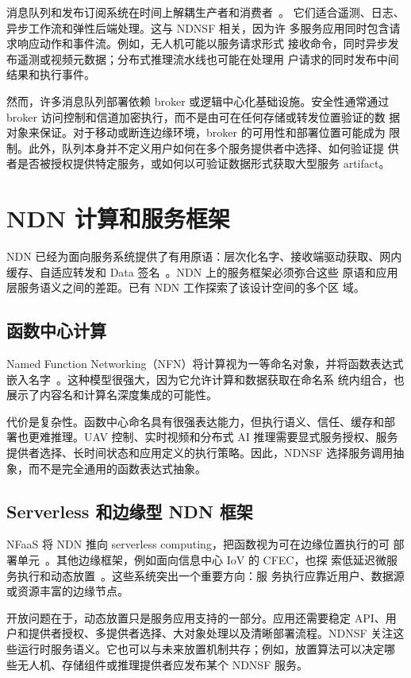 消息队列和发布订阅系统在时间上解耦生产者和消费者~\cite{messagequeue}。
它们适合遥测、日志、异步工作流和弹性后端处理。这与 NDNSF 相关，因为许
多服务应用同时包含请求响应动作和事件流。例如，无人机可能以服务请求形式
接收命令，同时异步发布遥测或视频元数据；分布式推理流水线也可能在处理用
户请求的同时发布中间结果和执行事件。

然而，许多消息队列部署依赖 broker 或逻辑中心化基础设施。安全性通常通过
broker 访问控制和信道加密执行，而不是由可在任何存储或转发位置验证的数
据对象来保证。对于移动或断连边缘环境，broker 的可用性和部署位置可能成为
限制。此外，队列本身并不定义用户如何在多个服务提供者中选择、如何验证提
供者是否被授权提供特定服务，或如何以可验证数据形式获取大型服务 artifact。

\section{NDN 计算和服务框架}

NDN 已经为面向服务系统提供了有用原语：层次化名字、接收端驱动获取、网内
缓存、自适应转发和 Data 签名~\cite{ndn}。NDN 上的服务框架必须弥合这些
原语和应用层服务语义之间的差距。已有 NDN 工作探索了该设计空间的多个区
域。

\subsection{函数中心计算}

Named Function Networking（NFN）将计算视为一等命名对象，并将函数表达式
嵌入名字~\cite{nfn}。这种模型很强大，因为它允许计算和数据获取在命名系
统内组合，也展示了内容名和计算名深度集成的可能性。

代价是复杂性。函数中心命名具有很强表达能力，但执行语义、信任、缓存和部
署也更难推理。UAV 控制、实时视频和分布式 AI 推理需要显式服务授权、服务
提供者选择、长时间状态和应用定义的执行策略。因此，NDNSF 选择服务调用抽
象，而不是完全通用的函数表达式抽象。

\subsection{Serverless 和边缘型 NDN 框架}

NFaaS 将 NDN 推向 serverless computing，把函数视为可在边缘位置执行的可
部署单元~\cite{nfaas}。其他边缘框架，例如面向信息中心 IoV 的 CFEC，也探
索低延迟微服务执行和动态放置~\cite{cfec}。这些系统突出一个重要方向：服
务执行应靠近用户、数据源或资源丰富的边缘节点。

开放问题在于，动态放置只是服务应用支持的一部分。应用还需要稳定 API、用
户和提供者授权、多提供者选择、大对象处理以及清晰部署流程。NDNSF 关注这
些运行时服务语义。它也可以与未来放置机制共存；例如，放置算法可以决定哪
些无人机、存储组件或推理提供者应发布某个 NDNSF 服务。

